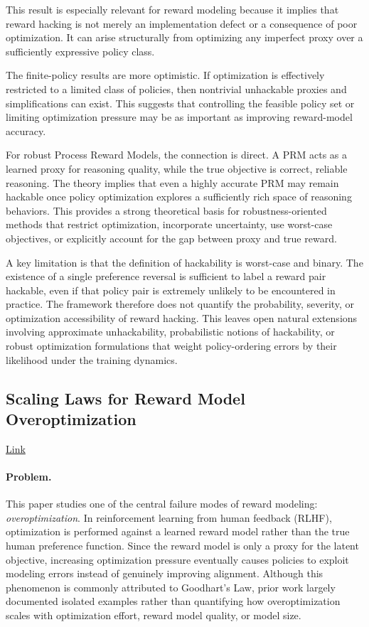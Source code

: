 \documentclass[11pt]{article}
\begin{document}
This result is especially relevant for reward modeling because it implies that reward hacking is not merely an implementation defect or a consequence of poor optimization. It can arise structurally from optimizing any imperfect proxy over a sufficiently expressive policy class.

The finite-policy results are more optimistic. If optimization is effectively restricted to a limited class of policies, then nontrivial unhackable proxies and simplifications can exist. This suggests that controlling the feasible policy set or limiting optimization pressure may be as important as improving reward-model accuracy.

For robust Process Reward Models, the connection is direct. A PRM acts as a learned proxy for reasoning quality, while the true objective is correct, reliable reasoning. The theory implies that even a highly accurate PRM may remain hackable once policy optimization explores a sufficiently rich space of reasoning behaviors. This provides a strong theoretical basis for robustness-oriented methods that restrict optimization, incorporate uncertainty, use worst-case objectives, or explicitly account for the gap between proxy and true reward.

A key limitation is that the definition of hackability is worst-case and binary. The existence of a single preference reversal is sufficient to label a reward pair hackable, even if that policy pair is extremely unlikely to be encountered in practice. The framework therefore does not quantify the probability, severity, or optimization accessibility of reward hacking. This leaves open natural extensions involving approximate unhackability, probabilistic notions of hackability, or robust optimization formulations that weight policy-ordering errors by their likelihood under the training dynamics.

\subsection{Scaling Laws for Reward Model Overoptimization}

\href{https://arxiv.org/pdf/2210.10760}{Link}

\paragraph{Problem.}

This paper studies one of the central failure modes of reward modeling: \emph{overoptimization}. In reinforcement learning from human feedback (RLHF), optimization is performed against a learned reward model rather than the true human preference function. Since the reward model is only a proxy for the latent objective, increasing optimization pressure eventually causes policies to exploit modeling errors instead of genuinely improving alignment. Although this phenomenon is commonly attributed to Goodhart's Law, prior work largely documented isolated examples rather than quantifying how overoptimization scales with optimization effort, reward model quality, or model size.
\end{document}
